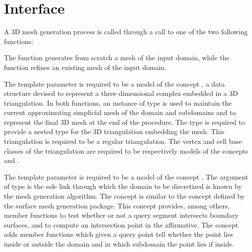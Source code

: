 \section{Interface}
\label{Mesh_3_section_interface}

A 3D mesh generation  process is called through a call
 to   one of the two following functions:
 


The function  generates from scratch a mesh
of the input domain, while
the function  refines
an existing mesh of the input domain.

The template parameter  is required to be a model of
the concept 
, a data structure devised to
represent a three dimensional complex embedded in a 3D
triangulation. In both functions,  an instance  of type  is used to maintain the current
approximating simplicial mesh of the domain and subdomains
and to represent the final  3D mesh at the end
of the procedure.
The type  is   required to provide a nested type
 for the 3D triangulation
embedding the mesh. This triangulation is required to be a regular
triangulation.
 The vertex and cell base classes of the
triangulation  are required to be respectively  models of the
concepts  and .

The template parameter  is required to be a model of
the concept  . The argument  of type
 is the sole link through which the domain
to be discretized is known  by the mesh generation algorithm. 
The concept  is similar to the concept  
defined by the surface mesh generation package.
This concept  provides, among others,
  member functions to test whether or not
a query segment intersects boundary surfaces,
and to compute an intersection point  in the affirmative.
The  concept adds  member functions 
which given a query point tell whether the point lies
inside or outside the domain and in which subdomain the point lies
if inside.

